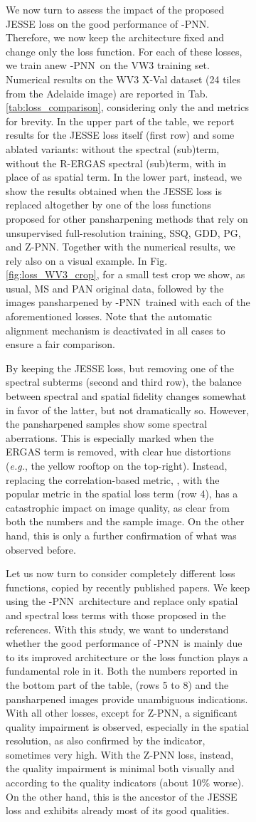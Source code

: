 \documentclass[journal]{IEEEtran}
\newcommand{\LPNN}  {-PNN}
\begin{document}
\begin{figure}
\begin{figure}
We now turn to assess the impact of the proposed JESSE loss on the good performance of \LPNN.
Therefore, we now keep the architecture fixed and change only the loss function.
For each of these losses, we train anew \LPNN\ on the VW3 training set.
Numerical results on the WV3 X-Val dataset (24 tiles from the Adelaide image) are reported in Tab.\ref{tab:loss_comparison},
considering only the  and  metrics for brevity.
In the upper part of the table, we report results for the JESSE loss itself (first row) and some ablated variants:
without the  spectral (sub)term, without the R-ERGAS spectral (sub)term, with  in place of  as spatial term.
In the lower part, instead, we show the results obtained
when the JESSE loss is replaced altogether by one of the loss functions proposed for other pansharpening methods that rely on unsupervised full-resolution training,
SSQ, GDD, PG, and Z-PNN.
Together with the numerical results, we rely also on a visual example.
In Fig.\ref{fig:loss_WV3_crop}, for a small test crop we show, as usual, MS and PAN original data,
followed by the images pansharpened by \LPNN\ trained with each of the aforementioned losses.
Note that the automatic alignment mechanism is deactivated in all cases to ensure a fair comparison.

By keeping the JESSE loss, but removing one of the spectral subterms (second and third row),
the balance between spectral and spatial fidelity changes somewhat in favor of the latter, but not dramatically so.
However, the pansharpened samples show some spectral aberrations.
This is especially marked when the ERGAS term is removed, with clear hue distortions ({\it e.g.}, the yellow rooftop on the top-right).
Instead, replacing the correlation-based metric, , with the popular  metric in the spatial loss term (row 4),
has a catastrophic impact on image quality, as clear from both the numbers and the sample image.
On the other hand, this is only a further confirmation of what was observed before.

Let us now turn to consider completely different loss functions, copied by recently published papers.
We keep using the \LPNN\ architecture and replace only spatial and spectral loss terms with those proposed in the references.
With this study, we want to understand whether the good performance of \LPNN\ is mainly due to its improved architecture
or the loss function plays a fundamental role in it.
Both the numbers reported in the bottom part of the table, (rows 5 to 8) and the pansharpened images provide unambiguous indications.
With all other losses, except for Z-PNN, a significant quality impairment is observed, especially in the spatial resolution,
as also confirmed by the  indicator, sometimes very high.
With the Z-PNN loss, instead, the quality impairment is minimal both visually and according to the quality indicators (about 10\% worse).
On the other hand, this is the ancestor of the JESSE loss and exhibits already most of its good qualities.


\end{figure}
\end{figure}
\end{document}
